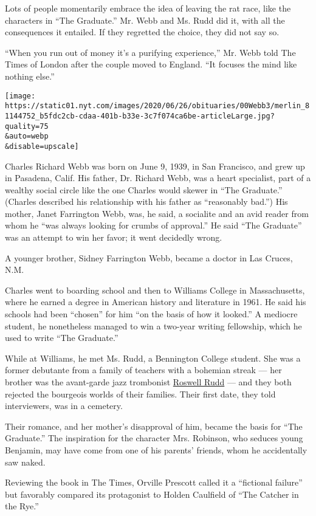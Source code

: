 Lots of people momentarily embrace the idea of leaving the rat race,
like the characters in ``The Graduate.'' Mr. Webb and Ms. Rudd did it,
with all the consequences it entailed. If they regretted the choice,
they did not say so.

``When you run out of money it's a purifying experience,'' Mr. Webb told
The Times of London after the couple moved to England. ``It focuses the
mind like nothing else.''

\texttt{[image: https://static01.nyt.com/images/2020/06/26/obituaries/00Webb3/merlin\_81144752\_b5fdc2cb-cdaa-401b-b33e-3c7f074ca6be-articleLarge.jpg?quality=75\\\&auto=webp\\\&disable=upscale]}

Charles Richard Webb was born on June 9, 1939, in San Francisco, and
grew up in Pasadena, Calif. His father, Dr. Richard Webb, was a heart
specialist, part of a wealthy social circle like the one Charles would
skewer in ``The Graduate.'' (Charles described his relationship with his
father as ``reasonably bad.'') His mother, Janet Farrington Webb, was,
he said, a socialite and an avid reader from whom he ``was always
looking for crumbs of approval.'' He said ``The Graduate'' was an
attempt to win her favor; it went decidedly wrong.

A younger brother, Sidney Farrington Webb, became a doctor in Las
Cruces, N.M.

Charles went to boarding school and then to Williams College in
Massachusetts, where he earned a degree in American history and
literature in 1961. He said his schools had been ``chosen'' for him ``on
the basis of how it looked.'' A mediocre student, he nonetheless managed
to win a two-year writing fellowship, which he used to write ``The
Graduate.''

While at Williams, he met Ms. Rudd, a Bennington College student. She
was a former debutante from a family of teachers with a bohemian streak
--- her brother was the avant-garde jazz trombonist
\href{https://www.nytimes.com/2017/12/26/obituaries/roswell-rudd-82-trombonist-with-a-wide-open-approach-is-dead.html}{Roswell
Rudd} --- and they both rejected the bourgeois worlds of their families.
Their first date, they told interviewers, was in a cemetery.

Their romance, and her mother's disapproval of him, became the basis for
``The Graduate.'' The inspiration for the character Mrs. Robinson, who
seduces young Benjamin, may have come from one of his parents' friends,
whom he accidentally saw naked.

Reviewing the book in The Times, Orville Prescott called it a
``fictional failure'' but favorably compared its protagonist to Holden
Caulfield of ``The Catcher in the Rye.''


